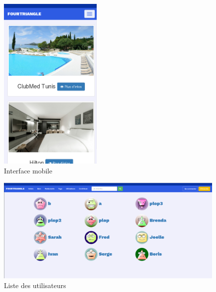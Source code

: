 \documentclass[10pt,a4paper]{article}
\begin{document}
\begin{center}
\begin{figure}[H]
   \includegraphics[width=5cm]{screen/responsive.png}
   \caption{Interface mobile}
\end{figure}


\begin{figure}[H]
   \includegraphics[width=15cm]{screen/users.png}
   \caption{Liste des utilisateurs}
\end{figure}
\end{center}
\end{document}
